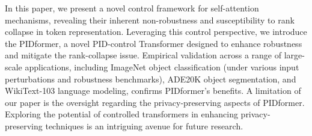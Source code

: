 In this paper, we present a novel control framework for self-attention mechanisms, revealing their inherent non-robustness and susceptibility to rank collapse in token representation. Leveraging this control perspective, we introduce the PIDformer, a novel PID-control Transformer designed to enhance robustness and mitigate the rank-collapse issue. Empirical validation across a range of large-scale applications, including ImageNet object classification (under various input perturbations and robustness benchmarks), ADE20K object segmentation, and WikiText-103 language modeling, confirms PIDformer's benefits. A limitation of our paper is the oversight regarding the privacy-preserving aspects of PIDformer. Exploring the potential of controlled transformers in enhancing privacy-preserving techniques is an intriguing avenue for future research.